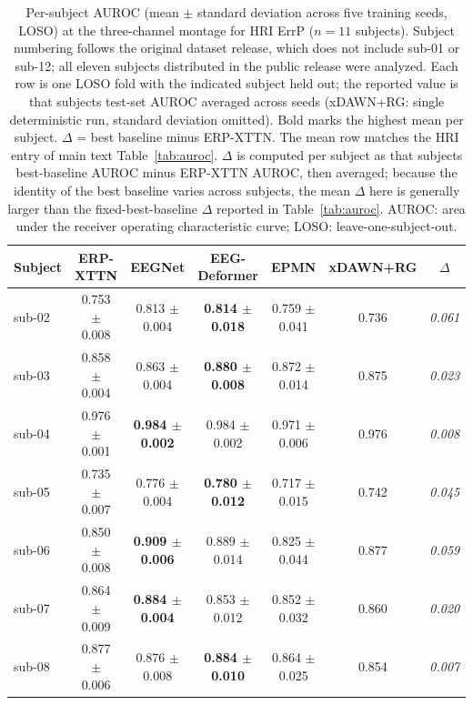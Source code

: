 
\begin{table}[t]
\centering
\caption{%
Per-subject AUROC (mean $\pm$ standard deviation across five training seeds, LOSO) at the three-channel montage for HRI ErrP ($n = 11$ subjects). Subject numbering follows the original dataset release, which does not include sub-01 or sub-12; all eleven subjects distributed in the public release were analyzed. Each row is one LOSO fold with the indicated subject held out; the reported value is that subject\textquotesingle s test-set AUROC averaged across seeds (xDAWN+RG: single deterministic run, standard deviation omitted). Bold marks the highest mean per subject. $\Delta$ = best baseline minus ERP-XTTN. The mean row matches the HRI entry of main text Table~\ref{tab:auroc}. $\Delta$ is computed per subject as that subject\textquotesingle s best-baseline AUROC minus ERP-XTTN AUROC, then averaged; because the identity of the best baseline varies across subjects, the mean $\Delta$ here is generally larger than the fixed-best-baseline $\Delta$ reported in Table~\ref{tab:auroc}. AUROC: area under the receiver operating characteristic curve; LOSO: leave-one-subject-out.%
}
\label{sup:tab-persubj-hri}
\begin{tabular}{lcccccc}
\toprule
Subject & ERP-XTTN & EEGNet & EEG-Deformer & EPMN & xDAWN+RG & $\Delta$ \\
\midrule
sub-02 & 0.753 $\pm$ 0.008 & 0.813 $\pm$ 0.004 & \textbf{0.814 $\pm$ 0.018} & 0.759 $\pm$ 0.041 & 0.736 & \textit{0.061} \\
sub-03 & 0.858 $\pm$ 0.004 & 0.863 $\pm$ 0.004 & \textbf{0.880 $\pm$ 0.008} & 0.872 $\pm$ 0.014 & 0.875 & \textit{0.023} \\
sub-04 & 0.976 $\pm$ 0.001 & \textbf{0.984 $\pm$ 0.002} & 0.984 $\pm$ 0.002 & 0.971 $\pm$ 0.006 & 0.976 & \textit{0.008} \\
sub-05 & 0.735 $\pm$ 0.007 & 0.776 $\pm$ 0.004 & \textbf{0.780 $\pm$ 0.012} & 0.717 $\pm$ 0.015 & 0.742 & \textit{0.045} \\
sub-06 & 0.850 $\pm$ 0.008 & \textbf{0.909 $\pm$ 0.006} & 0.889 $\pm$ 0.014 & 0.825 $\pm$ 0.044 & 0.877 & \textit{0.059} \\
sub-07 & 0.864 $\pm$ 0.009 & \textbf{0.884 $\pm$ 0.004} & 0.853 $\pm$ 0.012 & 0.852 $\pm$ 0.032 & 0.860 & \textit{0.020} \\
sub-08 & 0.877 $\pm$ 0.006 & 0.876 $\pm$ 0.008 & \textbf{0.884 $\pm$ 0.010} & 0.864 $\pm$ 0.025 & 0.854 & \textit{0.007} \\

\end{tabular}
\end{table}
